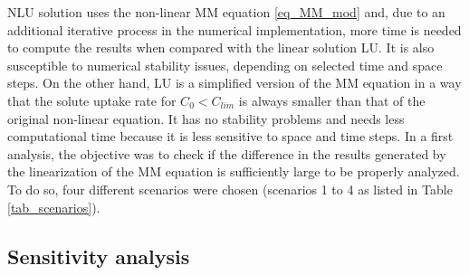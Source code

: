 %

NLU solution uses the non-linear MM equation \ref{eq_MM_mod} and, due to an additional iterative process in the numerical implementation, more time is needed to compute the results when compared with the linear solution LU. 
It is also susceptible to numerical stability issues, depending on selected time and space steps. 
On the other hand, LU is a simplified version of the MM equation in a way that the solute uptake rate for $C_0 < C_{lim}$ is always smaller than that of the original non-linear equation.
It has no stability problems and needs less computational time because it is less sensitive to space and time steps. 
In a first analysis, the objective was to check if the difference in the results generated by the linearization of the MM equation is sufficiently large to be properly analyzed.  
To do so, four different scenarios were chosen (scenarios 1 to 4 as listed in Table \ref{tab_scenarios}).

\subsection*{Sensitivity analysis}

